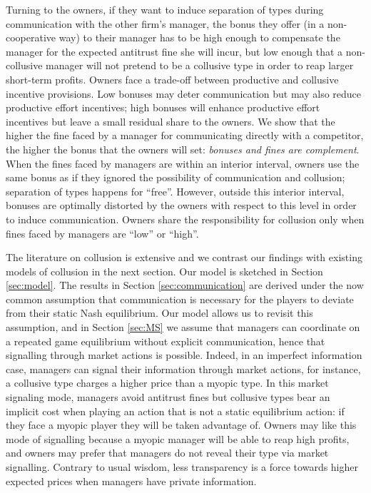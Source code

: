 \documentclass[]{article}
\begin{document}
Turning to the owners, if they want to induce separation of types during communication with the other firm's manager, the bonus they offer (in a non-cooperative way) to their manager has to be high enough to compensate the manager for the expected antitrust fine she will incur, but low enough that a non-collusive manager will not pretend to be a collusive type in order to reap larger short-term profits. Owners face a trade-off between productive and collusive incentive provisions. Low bonuses may deter communication but may also reduce productive effort incentives; high bonuses will enhance productive effort incentives but leave a small residual share to the owners. We show that the higher the fine faced by a manager for communicating directly with a competitor, the higher the bonus that the owners will set: \textit{bonuses and fines are complement}. When the fines faced by managers are within an interior interval, owners use the same bonus as if they ignored the possibility of communication and collusion; separation of types happens for ``free''. However, outside this interior interval, bonuses are optimally distorted by the owners with respect to this level in order to induce communication. Owners share the responsibility for collusion only when fines faced by managers are ``low'' or ``high''.

The literature on collusion is extensive and we contrast our findings with existing models of collusion in the next section. Our model is sketched in Section \ref{sec:model}. The  results  in  Section  \ref{sec:communication}  are derived  under  the  now  common  assumption  that  communication  is  necessary for  the  players  to deviate from their static Nash equilibrium. Our model allows us to revisit this assumption, and in  Section \ref{sec:MS} we assume  that  managers can coordinate on a repeated game equilibrium without explicit communication, hence that signalling through market actions is possible. Indeed, in an imperfect information case, managers can signal their information through market actions, for instance, a collusive type charges a higher price than a myopic type. In this market signaling mode, managers avoid antitrust fines but collusive types bear an implicit cost when playing an action that is not a static equilibrium action: if they face a myopic player they will be taken advantage of. Owners may like this mode of signalling because a myopic manager will be able to reap high profits, and owners may prefer that managers do not reveal their type via market signalling.  Contrary to usual wisdom, less transparency is a force towards higher expected prices when managers have private information.
%
\end{document}
